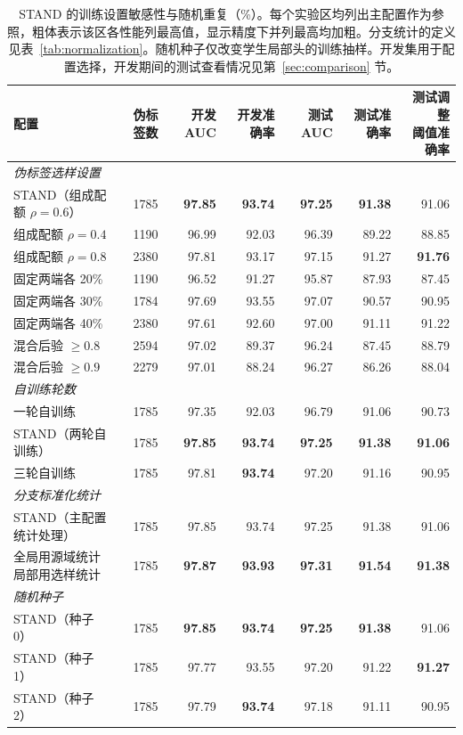 \begin{table}[htbp]
\centering\small
\caption{STAND 的训练设置敏感性与随机重复（\%）。每个实验区均列出主配置作为参照，粗体表示该区各性能列最高值，显示精度下并列最高均加粗。分支统计的定义见表~\ref{tab:normalization}。随机种子仅改变学生局部头的训练抽样。开发集用于配置选择，开发期间的测试查看情况见第~\ref{sec:comparison} 节。}
\label{tab:student_settings}
\begin{adjustbox}{max width=\linewidth}
\begin{tabular}{lrrrrrr}
\toprule
配置 & 伪标签数 & 开发 AUC & 开发准确率 & 测试 AUC & 测试准确率 & \makecell{测试调整\\阈值准确率}\\
\midrule
\multicolumn{7}{l}{\textit{伪标签选样设置}}\\
STAND（组成配额 $\rho=0.6$） & 1785 & \textbf{97.85} & \textbf{93.74} & \textbf{97.25} & \textbf{91.38} & 91.06\\
组成配额 $\rho=0.4$ & 1190 & 96.99 & 92.03 & 96.39 & 89.22 & 88.85\\
组成配额 $\rho=0.8$ & 2380 & 97.81 & 93.17 & 97.15 & 91.27 & \textbf{91.76}\\
固定两端各 20\% & 1190 & 96.52 & 91.27 & 95.87 & 87.93 & 87.45\\
固定两端各 30\% & 1784 & 97.69 & 93.55 & 97.07 & 90.57 & 90.95\\
固定两端各 40\% & 2380 & 97.61 & 92.60 & 97.00 & 91.11 & 91.22\\
混合后验 $\geq0.8$ & 2594 & 97.02 & 89.37 & 96.24 & 87.45 & 88.79\\
混合后验 $\geq0.9$ & 2279 & 97.01 & 88.24 & 96.27 & 86.26 & 88.04\\
\midrule
\multicolumn{7}{l}{\textit{自训练轮数}}\\
一轮自训练 & 1785 & 97.35 & 92.03 & 96.79 & 91.06 & 90.73\\
STAND（两轮自训练） & 1785 & \textbf{97.85} & \textbf{93.74} & \textbf{97.25} & \textbf{91.38} & \textbf{91.06}\\
三轮自训练 & 1785 & 97.81 & \textbf{93.74} & 97.20 & 91.16 & 90.95\\
\midrule
\multicolumn{7}{l}{\textit{分支标准化统计}}\\
STAND（主配置统计处理） & 1785 & 97.85 & 93.74 & 97.25 & 91.38 & 91.06\\
\makecell[l]{全局用源域统计\\局部用选样统计} & 1785 & \textbf{97.87} & \textbf{93.93} & \textbf{97.31} & \textbf{91.54} & \textbf{91.38}\\
\midrule
\multicolumn{7}{l}{\textit{随机种子}}\\
STAND（种子 0） & 1785 & \textbf{97.85} & \textbf{93.74} & \textbf{97.25} & \textbf{91.38} & 91.06\\
STAND（种子 1） & 1785 & 97.77 & 93.55 & 97.20 & 91.22 & \textbf{91.27}\\
STAND（种子 2） & 1785 & 97.79 & \textbf{93.74} & 97.18 & 91.11 & 90.95\\
\bottomrule
\end{tabular}
\end{adjustbox}
\end{table}
